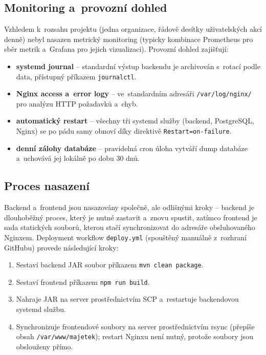 \subsection{Monitoring a~provozní dohled}

Vzhledem k~rozsahu projektu (jedna organizace, řádově desítky uživatelských akcí denně) nebyl nasazen metrický monitoring (typicky kombinace Prometheus pro sběr metrik a~Grafana pro jejich vizualizaci). Provozní dohled zajišťují:

\begin{itemize}
	\item \textbf{systemd journal} -- standardní výstup backendu je archivován s~rotací podle data, přístupný příkazem \texttt{journalctl}.
	\item \textbf{Nginx access a~error logy} -- ve~standardním adresáři \texttt{/var/log/nginx/} pro analýzu HTTP požadavků a~chyb.
	\item \textbf{automatický restart} -- všechny tři systemd služby (backend, PostgreSQL, Nginx) se po pádu samy obnoví díky direktivě \texttt{Restart=on-failure}.
	\item \textbf{denní zálohy databáze} -- pravidelná cron úloha vytváří dump databáze a~uchovává jej lokálně po dobu 30 dnů.
\end{itemize}

\subsection{Proces nasazení}

Backend a~frontend jsou nasazovány společně, ale odlišnými kroky -- backend je dlouhoběžný proces, který je nutné zastavit a~znovu spustit, zatímco frontend je sada statických souborů, kterou stačí synchronizovat do adresáře obsluhovaného Nginxem. Deployment workflow \texttt{deploy.yml} (spouštěný manuálně z~rozhraní GitHubu) provede následující kroky:

\begin{enumerate}
	\item Sestaví backend JAR soubor příkazem \texttt{mvn clean package}.
	\item Sestaví frontend příkazem \texttt{npm run build}.
	\item Nahraje JAR na server prostřednictvím SCP a~restartuje backendovou systemd službu.
	\item Synchronizuje frontendové soubory na server prostřednictvím rsync (přepíše obsah \texttt{/var/www/majetek}); restart Nginxu není nutný, protože soubory jsou obslouženy přímo.
\end{enumerate}

